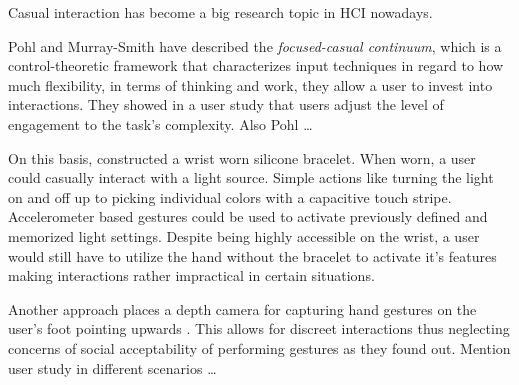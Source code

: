 Casual interaction has become a big research topic in \ac{HCI} nowadays.

Pohl and Murray-Smith \cite{pohl2013focused} have described the \textit{focused-casual continuum}, which is a control-theoretic framework that characterizes input techniques in regard to how much flexibility, in terms of thinking and work, they allow a user to invest into interactions. They showed in a user study that users adjust the level of engagement to the task's complexity. Also Pohl \dots

On this basis, \cite{Busse2014Thesis} constructed a wrist worn silicone bracelet. When worn, a user could casually interact with a light source. Simple actions like turning the light on and off up to picking individual colors with a capacitive touch stripe. Accelerometer based gestures could be used to activate previously defined and memorized light settings. Despite being highly accessible on the wrist, a user would still have to utilize the hand without the bracelet to activate it's features making interactions rather impractical in certain situations.

Another approach places a depth camera for capturing hand gestures on the user's foot pointing upwards \cite{bailly2012shoesense}. This allows for discreet interactions thus neglecting concerns of social acceptability of performing gestures as they found out. Mention user study in different scenarios \dots







